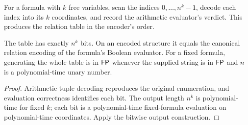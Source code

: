 \begin{definition}
  \label{def:desc-formula-table-code}
  \leanok
  For a formula with $k$ free variables, scan the indices $0,\ldots,n^k-1$,
  decode each index into its $k$ coordinates, and record the arithmetic
  evaluator's verdict. This produces the relation table in the encoder's order.
\end{definition}

\begin{theorem}
  \label{thm:desc-formula-table-code}
  \leanok
  The table has exactly $n^k$ bits. On an encoded structure it equals the
  canonical relation encoding of the formula's Boolean evaluator. For a fixed
  formula, generating the whole table is in $\mathsf{FP}$ whenever the supplied
  string is in $\mathsf{FP}$ and $n$ is a polynomial-time unary number.
\end{theorem}
\begin{proof}
  \leanok
  Arithmetic tuple decoding reproduces the original enumeration, and evaluation
  correctness identifies each bit. The output length $n^k$ is polynomial-time
  for fixed $k$; each bit is a polynomial-time fixed-formula evaluation on
  polynomial-time coordinates. Apply the bitwise output construction.
\end{proof}

